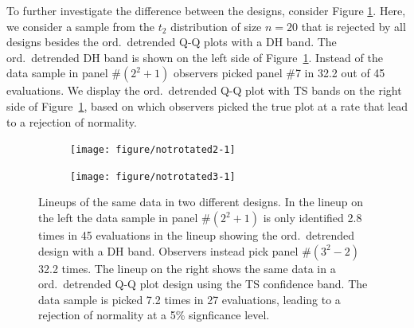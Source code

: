 \documentclass[12pt]{article}\usepackage[]{graphicx}\usepackage[]{color}
\newenvironment{knitrout}{}{} %
\begin{document}
To further investigate the difference between the designs, consider Figure \ref{fig:rotstd}. Here, we consider a sample from the $t_2$ distribution of size $n=20$ that is rejected by all designs besides the ord.\ detrended  Q-Q plots with a DH band.  
The ord.\ detrended  DH band is shown on the left side of Figure~\ref{fig:rotstd}. Instead of the data sample in panel \#$(2^2+1)$ observers picked panel \#7 in 32.2 out of 45 evaluations. We display the ord.\ detrended  Q-Q plot with TS bands on the right side of Figure~\ref{fig:rotstd}, based on which observers picked the true plot at a rate that lead to a rejection of normality.
\begin{figure}[hbt]

\begin{subfigure}{0.5\textwidth}
\begin{knitrout}
\color{fgcolor}
\texttt{[image: figure/notrotated2-1]} 

\end{knitrout}
\end{subfigure}
\begin{subfigure}{0.5\textwidth}
\begin{knitrout}
\color{fgcolor}
\texttt{[image: figure/notrotated3-1]} 

\end{knitrout}
\end{subfigure}
\caption{\label{fig:rotstd}Lineups of the same data in two different designs. %
In the lineup on the left the data sample in panel \#$(2^2+1)$ is only identified 2.8 times in 45 evaluations in the lineup showing the ord.\ detrended  design with a DH band. Observers instead pick panel \#$(3^2-2)$ 32.2 times. The lineup on the right shows the same data in a ord.\ detrended  Q-Q plot design using the TS confidence band. The data sample is picked 7.2 times in 27 evaluations, leading to a rejection of normality at a 5\% signficance level.}
\end{figure}
\end{document}
